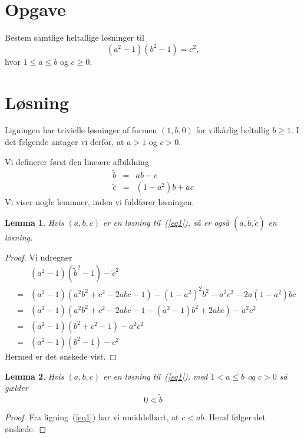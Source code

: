 \documentclass[12pt,oneside,a4paper]{article}
\newcommand{\bas}{\begin{eqnarray*}}
\newcommand{\eas}{\end{eqnarray*}}
\newcommand{\be}{\begin{equation}}
\newcommand{\ee}{\end{equation}}
\newtheorem{lem}{Lemma}[section]
\begin{document}
\section*{Opgave}
Bestem samtlige heltallige løsninger til
\be
(a^2-1)(b^2-1) = c^2,
\label{eq1}
\ee
hvor $1\le a\le b$ og $c\ge 0$.

\section*{Løsning}
Ligningen har trivielle løsninger af formen $(1, b, 0)$ for vilkårlig
heltallig $b\ge 1$. I det følgende antager vi derfor, at $a>1$ og $c>0$.

Vi definerer først den lineære afbildning
\bas
\tilde b &=& ab-c \\
\tilde c &=& (1-a^2)b+ac
\eas
Vi viser nogle lemmaer, inden vi fuldfører løsningen.

\begin{lem}
    Hvis $(a,b,c)$ er en løsning til~(\ref{eq1}), så er også $(a,\tilde b,
    \tilde c)$ en løsning.
\end{lem}
\begin{proof}
    Vi udregner
    \bas
    && (a^2-1)({\tilde b}^2-1) - {\tilde c}^2 \\
    &=& (a^2-1)\left(a^2b^2 + c^2 - 2abc - 1\right) - (1-a^2)^2b^2-a^2c^2-2a(1-a^2)bc \\
    &=& (a^2-1)\left(a^2b^2 + c^2 - 2abc - 1 - (a^2-1)b^2 + 2abc\right) - a^2c^2 \\
    &=& (a^2-1)(b^2 + c^2 - 1) - a^2c^2 \\
    &=& (a^2-1)(b^2-1) - c^2
    \eas
    Hermed er det ønskede vist.
\end{proof}

\begin{lem}
    Hvis $(a,b,c)$ er en løsning til~(\ref{eq1}), med $1<a\le b$ og $c>0$
    så gælder
    $$
    0 < \tilde b
    $$
\end{lem}
\begin{proof}
    Fra ligning~(\ref{eq1}) har vi umiddelbart, at $c<ab$. Heraf følger det ønskede.
\end{proof}
\end{document}
